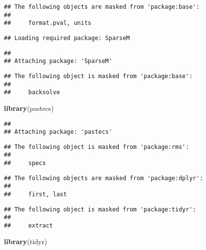 \documentclass[]{tufte-handout}
\newenvironment{Shaded}{\begin{snugshade}}{\end{snugshade}}
\newcommand{\KeywordTok}[1]{\textcolor[rgb]{0.13,0.29,0.53}{\textbf{#1}}}
\newcommand{\DataTypeTok}[1]{\textcolor[rgb]{0.13,0.29,0.53}{#1}}
\newcommand{\StringTok}[1]{\textcolor[rgb]{0.31,0.60,0.02}{#1}}
\newcommand{\OperatorTok}[1]{\textcolor[rgb]{0.81,0.36,0.00}{\textbf{#1}}}
\newcommand{\NormalTok}[1]{#1}
\begin{document}
\begin{verbatim}
## The following objects are masked from 'package:base':
## 
##     format.pval, units
\end{verbatim}

\begin{verbatim}
## Loading required package: SparseM
\end{verbatim}

\begin{verbatim}
## 
## Attaching package: 'SparseM'
\end{verbatim}

\begin{verbatim}
## The following object is masked from 'package:base':
## 
##     backsolve
\end{verbatim}

\begin{Shaded}
\begin{Highlighting}[]
\KeywordTok{library}\NormalTok{(pastecs)}
\end{Highlighting}
\end{Shaded}

\begin{verbatim}
## 
## Attaching package: 'pastecs'
\end{verbatim}

\begin{verbatim}
## The following object is masked from 'package:rms':
## 
##     specs
\end{verbatim}

\begin{verbatim}
## The following objects are masked from 'package:dplyr':
## 
##     first, last
\end{verbatim}

\begin{verbatim}
## The following object is masked from 'package:tidyr':
## 
##     extract
\end{verbatim}

\begin{Shaded}
\begin{Highlighting}[]
\KeywordTok{library}\NormalTok{(tidyr)}
\end{Highlighting}
\end{Shaded}

\begin{Shaded}
\end{Shaded}
\end{document}
